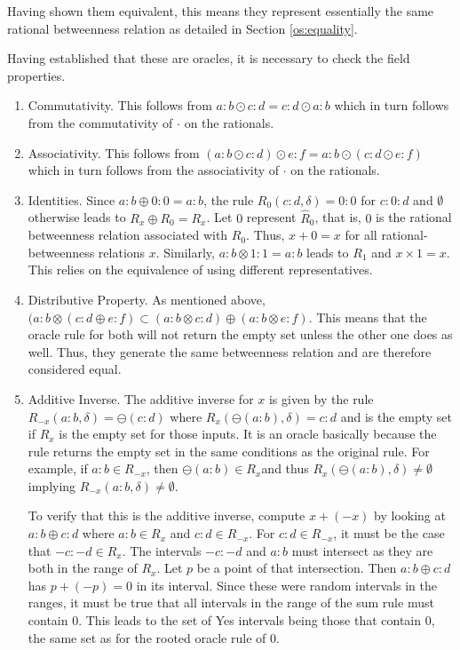 \documentclass[12pt]{article}
\begin{document}
Having shown them equivalent, this means they represent essentially the same rational betweenness relation as detailed in Section \ref{os:equality}.

Having established that these are oracles, it is necessary to check the field properties. 
\begin{enumerate}
    \item Commutativity. This follows from $a:b \odot c:d = c:d \odot a:b$ which in turn follows from the commutativity of $\cdot$ on the rationals. 
    \item Associativity. This follows from $(a:b \odot c:d) \odot e:f = a:b \odot (c:d \odot e:f)$ which in turn follows from the associativity of $\cdot$ on the rationals. 
    \item Identities. Since $a:b \oplus 0:0 = a:b$, the rule $R_0 (c:d, \delta) = 0:0$ for $c:0:d$ and $\emptyset$ otherwise leads to $R_x \oplus R_0 = R_x$. Let $0$ represent $\hat{R}_0$, that is, $0$ is the rational betweenness relation associated with $R_0$. Thus, $x + 0 = x$ for all rational-betweenness relations $x$. Similarly, $a:b \otimes 1:1 = a:b$ leads to $R_1$ and $x \times 1 = x$. This relies on the equivalence of using different representatives. 
    \item Distributive Property. As mentioned above, $( a:b \otimes ( c:d \oplus e:f) \subset (a:b \otimes c:d) \oplus (a:b \otimes e:f)$. This means that the oracle rule for both will not return the empty set unless the other one does as well. Thus, they generate the same betweenness relation and are therefore considered equal. 
    \item Additive Inverse.  The additive inverse for $x$ is given by the rule $R_{-x}(a:b, \delta) = \ominus (c:d)$ where $R_x (\ominus (a:b), \delta) = c:d$  and is the empty set if $R_x$ is the empty set for those inputs. It is an oracle basically because the rule returns the empty set in the same conditions as the original rule. For example, if $a:b \in R_{-x}$, then $\ominus (a:b) \in R_x$and thus $R_x(\ominus (a:b), \delta) \neq \emptyset$ implying $R_{-x} (a:b, \delta) \neq \emptyset$.

    To verify that this is the additive inverse, compute $x + (-x)$ by looking at $a:b \oplus c:d$ where $a:b \in R_x$ and $c:d \in R_{-x}$. For $c:d \in R_{-x}$, it must be the case that $-c:-d \in R_x$. The intervals $-c : -d$ and $a:b$ must intersect as they are both in the range of $R_x$. Let $p$ be a point of that intersection. Then $a:b \oplus c:d$ has $p + (-p) =0$ in its interval. Since these were random intervals in the ranges, it must be true that all intervals in the range of the sum rule must contain 0. This leads to the set of Yes intervals being those that contain 0, the same set as for the rooted oracle rule of 0. 
    

\end{enumerate}
\end{document}
